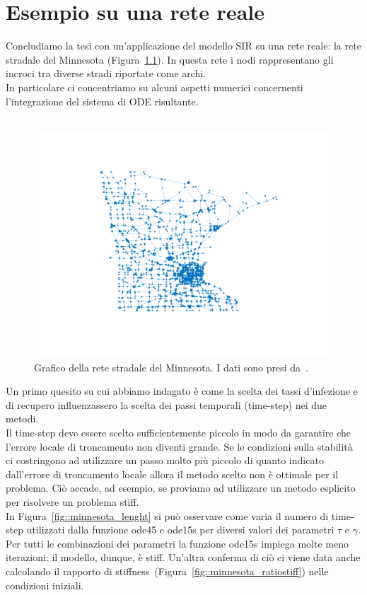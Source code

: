 \chapter{Esempio su una rete reale}
Concludiamo la tesi con un'applicazione del modello SIR su una rete reale:  la rete stradale del Minnesota (Figura~\ref{fig::minnesota}). In questa rete i nodi rappresentano gli incroci tra diverse stradi riportate come archi.\\
In particolare ci concentriamo su alcuni aspetti numerici concernenti l'integrazione del sistema di ODE risultante.\\ \\
\begin{figure}[htb]
\centering
\includegraphics{Figure/minnesota}
	\caption{Grafico della rete stradale del Minnesota. I dati sono presi da~\cite{RepMatrici}.}\label{fig::minnesota}
\end{figure}
\newpage
Un primo quesito su cui abbiamo indagato \`e come la scelta dei tassi d'infezione e di recupero influenzassero la scelta dei passi temporali (time-step) nei due metodi.\\
Il time-step deve essere scelto sufficientemente piccolo in modo da garantire che l'errore locale di troncamento non diventi grande.  Se le condizioni sulla stabilit\`a ci costringono ad utilizzare un passo molto pi\`u piccolo di quanto indicato dall'errore di troncamento locale allora il metodo scelto non \`e ottimale per il problema. Ci\`o accade, ad esempio, se proviamo ad utilizzare un metodo esplicito per risolvere un problema stiff.\\
 In Figura~\ref{fig::minnesota_lenght} si pu\`o osservare come varia il numero di time-step  utilizzati dalla  funzione ode45 e ode15s per diversi valori dei parametri $\tau$ e $\gamma$. Per tutti le combinazioni dei parametri la funzione ode15s impiega molte meno iterazioni: il modello, dunque, \`e stiff. Un'altra conferma di ci\`o ci viene data anche calcolando il rapporto di stiffness~(Figura~\ref{fig::minnesota_ratiostiff}) nelle condizioni iniziali.\\
